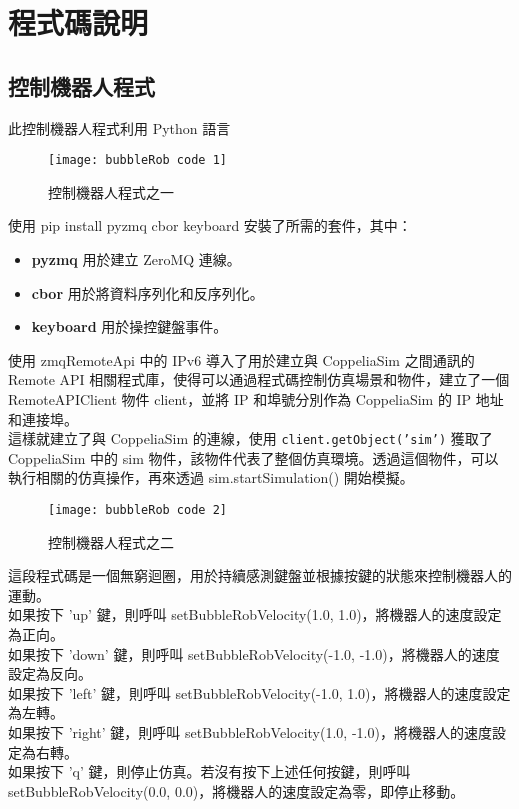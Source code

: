\chapter{程式碼說明}
\renewcommand{\baselinestretch}{10.0} %
\setcounter{page}{5}  %
\fontsize{14pt}{2.5pt}\sectionef

\section{控制機器人程式}
此控制機器人程式利用 Python 語言
\begin{figure}[hbt!]
\begin{center}
\texttt{[image: bubbleRob code 1]}
\caption{\Large 控制機器人程式之一}\label{控制機器人程式之一}
\end{center}
\end{figure} 
使用 pip install pyzmq cbor keyboard 安裝了所需的套件，其中：\\
\begin{itemize}
\item \textbf{pyzmq} 用於建立 ZeroMQ 連線。
\item \textbf{cbor} 用於將資料序列化和反序列化。
\item \textbf{keyboard} 用於操控鍵盤事件。
\end{itemize}
使用 zmqRemoteApi 中的 IPv6  導入了用於建立與 CoppeliaSim 之間通訊的 Remote API 相關程式庫，使得可以通過程式碼控制仿真場景和物件，建立了一個 RemoteAPIClient 物件 client，並將 IP 和埠號分別作為 CoppeliaSim 的 IP 地址和連接埠。\\
這樣就建立了與 CoppeliaSim 的連線，使用 \texttt{client.getObject('sim')} 獲取了 CoppeliaSim 中的 sim 物件，該物件代表了整個仿真環境。透過這個物件，可以執行相關的仿真操作，再來透過  sim.startSimulation() 開始模擬。\\
\newpage

\begin{figure}[hbt!]
\begin{center}
\texttt{[image: bubbleRob code 2]}
\caption{\Large 控制機器人程式之二}\label{控制機器人程式之二}
\end{center}
\end{figure} 
這段程式碼是一個無窮迴圈，用於持續感測鍵盤並根據按鍵的狀態來控制機器人的運動。\\
如果按下 'up' 鍵，則呼叫 setBubbleRobVelocity(1.0, 1.0)，將機器人的速度設定為正向。\\
如果按下 'down' 鍵，則呼叫 setBubbleRobVelocity(-1.0, -1.0)，將機器人的速度設定為反向。\\
如果按下 'left' 鍵，則呼叫 setBubbleRobVelocity(-1.0, 1.0)，將機器人的速度設定為左轉。\\
如果按下 'right' 鍵，則呼叫 setBubbleRobVelocity(1.0, -1.0)，將機器人的速度設定為右轉。\\
如果按下 'q' 鍵，則停止仿真。若沒有按下上述任何按鍵，則呼叫 setBubbleRobVelocity(0.0, 0.0)，將機器人的速度設定為零，即停止移動。\\
\newpage

